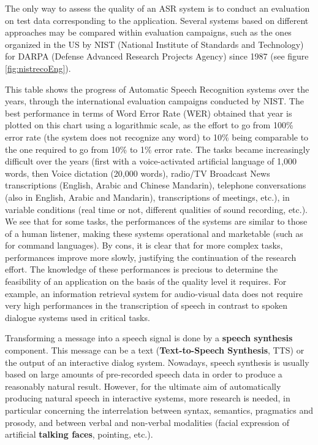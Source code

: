 \begin{multicols}{2}
The only way to assess the quality of an ASR system is to conduct an
evaluation on test data corresponding to the application. Several
systems based on different approaches may be compared within
evaluation campaigns, such as the ones organized in the US by NIST
(National Institute of Standards and Technology) for DARPA (Defense
Advanced Research Projects Agency) since 1987 (see figure
\ref{fig:nistrecoEng}).

This table shows the progress of Automatic Speech Recognition systems
over the years, through the international evaluation campaigns
conducted by NIST.  The best performance in terms of Word Error Rate
(WER) obtained that year is plotted on this chart using a logarithmic
scale, as the effort to go from 100\% error rate (the system does not
recognize any word) to 10\% being comparable to the one required to go
from 10\% to 1\% error rate. The tasks became increasingly difficult
over the years (first with a voice-activated artificial language of
1,000 words, then Voice dictation (20,000 words), radio/TV Broadcast
News transcriptions (English, Arabic and Chinese Mandarin), telephone
conversations (also in English, Arabic and Mandarin), transcriptions
of meetings, etc.), in variable conditions (real time or not,
different qualities of sound recording, etc.). We see that for some
tasks, the performances of the systems are similar to those of a human
listener, making these systems operational and marketable (such as for
command languages). By cons, it is clear that for more complex tasks,
performances improve more slowly, justifying the continuation of the
research effort. The knowledge of these performances is precious to
determine the feasibility of an application on the basis of the
quality level it requires. For example, an information retrieval
system for audio-visual data does not require very high performances
in the transcription of speech in contrast to spoken dialogue systems
used in critical tasks.

Transforming a message into a speech signal is done by a {\bf speech
synthesis} component. This message can be a text ({\bf Text-to-Speech
Synthesis}, TTS) or the output of an interactive dialog system. Nowadays,
speech synthesis is usually based on large amounts of pre-recorded
speech data in order to produce a reasonably natural result. However,
for the ultimate aim of automatically producing natural speech in
interactive systems, more research is needed, in particular concerning
the interrelation between syntax, semantics, pragmatics and prosody,
and between verbal and non-verbal modalities (facial expression of
artificial {\bf talking faces}, pointing, etc.).


\end{multicols}
